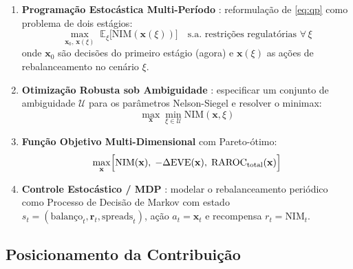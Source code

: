 \documentclass[12pt, a4paper, oneside]{article}
\newcommand{\E}{\mathbb{E}}
\begin{document}
\begin{enumerate}
  \item \textbf{Programação Estocástica Multi-Período}
    \citep{BirgeLouveaux2011,KusyZiemba1986}: reformulação de
    \eqref{eq:qp} como problema de dois estágios:
    \begin{equation}
      \max_{\mathbf{x}_0,\,\mathbf{x}(\xi)} \;
        \E_\xi\!\bigl[\text{NIM}(\mathbf{x}(\xi))\bigr]
      \quad \text{s.a.\ restrições regulatórias } \forall\,\xi
      \label{eq:stoch_prog}
    \end{equation}
    onde $\mathbf{x}_0$ são decisões do primeiro estágio (agora) e
    $\mathbf{x}(\xi)$ as ações de rebalanceamento no cenário $\xi$.

  \item \textbf{Otimização Robusta sob Ambiguidade}
    \citep{BenTalNemirovski2002,Fabozzi2007}: especificar um conjunto
    de ambiguidade $\mathcal{U}$ para os parâmetros Nelson-Siegel e
    resolver o minimax:
    \begin{equation}
      \max_{\mathbf{x}} \min_{\xi \in \mathcal{U}}
        \text{NIM}(\mathbf{x}, \xi)
      \label{eq:robust}
    \end{equation}

  \item \textbf{Função Objetivo Multi-Dimensional} com Pareto-ótimo:
    \begin{equation}
      \max_{\mathbf{x}} \Bigl[
        \text{NIM}(\mathbf{x}),\;
        -\Delta\text{EVE}(\mathbf{x}),\;
        \text{RAROC}_{\text{total}}(\mathbf{x})
      \Bigr]
      \label{eq:multiobj}
    \end{equation}

  \item \textbf{Controle Estocástico / MDP}
    \citep{BertsekasSheve1978,Costa2005}: modelar o rebalanceamento
    periódico como Processo de Decisão de Markov com estado
    $s_t = (\text{balanço}_t, \mathbf{r}_t, \text{spreads}_t)$,
    ação $a_t = \mathbf{x}_t$ e recompensa $r_t = \text{NIM}_t$.
\end{enumerate}

\subsection{Posicionamento da Contribuição}
\end{document}

